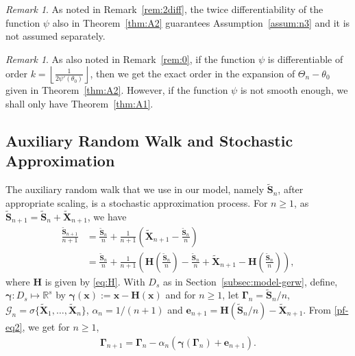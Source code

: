 \documentclass[12pt]{amsart}
\theoremstyle{plain}
\theoremstyle{remark}
\newtheorem{remark}[theorem]{Remark}
\numberwithin{equation}{section}
\begin{document}
\begin{remark}
    As noted in Remark~\ref{rem:2diff}, the twice differentiability of the function $\psi$ also in Theorem~\ref{thm:A2} guarantees Assumption~\ref{assum:n3} and it is not assumed separately.
\end{remark}

\begin{remark}
    As also noted in Remark~\ref{rem:0}, if the function $\psi$ is differentiable of order $k= \left\lfloor \frac1{2\psi'(\theta_0)} \right\rfloor$, then we get the exact order in the expansion of $\Theta_n - \theta_0$ given in Theorem~\ref{thm:A2}. However, if the function $\psi$ is not smooth enough, we shall only have Theorem~\ref{thm:A1}.
\end{remark}

\subsection{Auxiliary Random Walk and Stochastic Approximation}\label{sec:proofs-lemmas}

The auxiliary random walk that we use in our model, namely $\boldsymbol{\widetilde{S}}_n$, after appropriate scaling, is a stochastic approximation process. For $n\geq 1$, as $\boldsymbol{\widetilde{S}}_{n+1} = \boldsymbol{\widetilde{S}}_n + \boldsymbol{\widetilde{X}}_{n+1}$, we have
\begin{align}\label{pf-eq2}
    \frac{\boldsymbol{\widetilde{S}}_{n+1}}{n+1} &= \frac{\boldsymbol{\widetilde{S}}_{n}}{n} + \frac{1}{n+1}\left(\boldsymbol{\widetilde{X}}_{n+1} - \frac{\boldsymbol{\widetilde{S}}_{n}}{n}\right) \nonumber \\ &
    = \frac{\boldsymbol{\widetilde{S}}_{n}}{n} + \frac{1}{n+1}\left(\boldsymbol{H}\left(\frac{\boldsymbol{\widetilde{S}}_{n}}{n}\right) - \frac{\boldsymbol{\widetilde{S}}_{n}}{n} + \boldsymbol{\widetilde{X}}_{n+1} - \boldsymbol{H}\left(\frac{\boldsymbol{\widetilde{S}}_{n}}{n}\right)\right),
\end{align}
where $\boldsymbol{H}$ is given by \eqref{eq:H}. With $D_s$ as in Section~\ref{subsec:model-gerw}, define, $\boldsymbol{\gamma}: D_s \mapsto \mathbb{R}^s$ by $\boldsymbol{\gamma}(\boldsymbol{x}) := \boldsymbol{x} - \boldsymbol{H}(\boldsymbol{x})$ and for $n \geq 1$, let $\boldsymbol{\Gamma}_{n} = {\boldsymbol{\widetilde{S}}_n}/{n}$, $\mathcal{G}_{n} = \sigma\{\boldsymbol{\widetilde{X}}_1, \ldots, \boldsymbol{\widetilde{X}}_n\}$, $\alpha_n = 1/(n+1)$ and $\boldsymbol{e}_{n+1} = \boldsymbol{H}\left({\boldsymbol{\widetilde{S}}_{n}}/{n}\right) - \boldsymbol{\widetilde{X}}_{n+1}$. From \eqref{pf-eq2}, we get for $n \geq 1$,
\begin{align}\label{eq-sa2}
   \boldsymbol{\Gamma}_{n+1} = \boldsymbol{\Gamma}_{n} - \alpha_n\left(\boldsymbol{\gamma}(\boldsymbol{\Gamma}_{n}) + \boldsymbol{e}_{n+1}\right).
\end{align}
\end{document}
